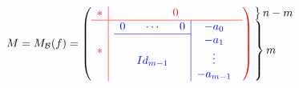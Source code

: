 \documentclass{article}
\begin{document}
	\[
		M=M_\mathcal{B}(f)=
		\left(	\color{red}
			\begin{array}{c|c}
				 * & 0 \\ \hline
				 * & %
				\color{blue}
				\begin{array}{c c c|c}
					0 & \cdots & 0 & -a_0 \\ \cline{1-3}
						&        &   & -a_1 \\
						&Id_{m-1}&   & \vdots \\
						&        &   & -a_{m-1}
				\end{array} 
			\end{array}
		\right)
		\begin{array}{@{\kern-\nulldelimiterspace}l@{}}
		\left.
			\begin{array}{@{}c@{}}
				\vphantom{0}
			\end{array}
		\right\}n-m \\
		\left.
			\begin{array}{@{}c@{}}
				\vphantom{-a_0} \\ 
				\vphantom{-a_1} \\
				\vphantom{\vdots} \\
				\vphantom{-a_{m-1}}
			\end{array}
		\right\}
		m
		\end{array}
	\]




\hfill
\end{document}
